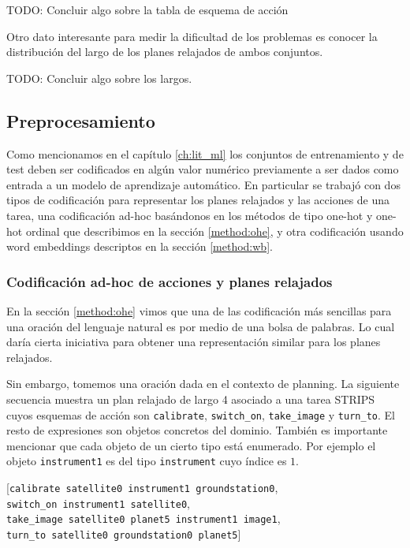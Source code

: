 TODO: Concluir algo sobre la tabla de esquema de acción

Otro dato interesante para medir la dificultad de los problemas es conocer la
distribución del largo de los planes relajados de ambos conjuntos.

TODO: Concluir algo sobre los largos.

\subsection{Preprocesamiento}
\label{method:preprocessing}

Como mencionamos en el capítulo \ref{ch:lit_ml} los conjuntos de entrenamiento y
de test deben ser codificados en algún valor numérico previamente a ser dados
como entrada a un modelo de aprendizaje automático. En particular se trabajó con
dos tipos de codificación para representar los planes relajados y las acciones
de una tarea, una codificación ad-hoc basándonos en los métodos de tipo one-hot
y one-hot ordinal que describimos en la sección \ref{method:ohe}, y otra
codificación usando word embeddings descriptos en la sección \ref{method:wb}.

\subsubsection{Codificación ad-hoc de acciones y planes relajados}
\label{method:vectorization}

En la sección \ref{method:ohe} vimos que una de las codificación más sencillas
para una oración del lenguaje natural es por medio de una bolsa de palabras. Lo
cual daría cierta iniciativa para obtener una representación similar para los
planes relajados.

Sin embargo, tomemos una oración dada en el contexto de planning. La siguiente
secuencia muestra un plan relajado de largo 4 asociado a una tarea STRIPS cuyos
esquemas de acción son \verb|calibrate|, \verb|switch_on|, \verb|take_image| y
\verb|turn_to|. El resto de expresiones son objetos concretos del dominio.
También es importante mencionar que cada objeto de un cierto tipo está
enumerado. Por ejemplo el objeto \verb|instrument1| es del tipo
\verb|instrument| cuyo índice es $1$. 

\begin{center}
    [\verb|calibrate satellite0 instrument1 groundstation0|, \\
    \verb|switch_on instrument1 satellite0|, \\
    \verb|take_image satellite0 planet5 instrument1 image1|, \\
    \verb|turn_to satellite0 groundstation0 planet5|] \\
\end{center}

